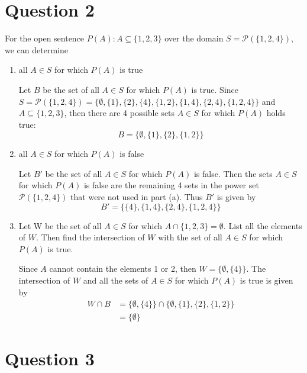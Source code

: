 \documentclass[11pt, oneside]{article}   	%
\begin{document}
\section*{Question 2}

For the open sentence $P(A) : A \subseteq \{1,2,3\}$ over the domain $S = \mathcal{P}(\{1,2,4\})$, we can determine

\begin{enumerate}[ (a)]           
    \item all $A \in S$ for which $P(A)$ is true
    
    Let $B$ be the set of all $A \in S$ for which $P(A)$ is true. Since $S = \mathcal{P}(\{1,2,4\}) =\{ \emptyset, \{1\}, \{2\}, \{4\}, \{1, 2\}, \{1, 4\}, \{2, 4\}, \{1, 2, 4\} \}$ and $A \subseteq \{1,2,3\}$, then there are 4 possible sets $A \in S$ for which $P(A)$ holds true: 
    $$B = \{\emptyset, \{1\}, \{2\}, \{1, 2\} \}$$
    
    \item all $A \in S$ for which $P(A)$ is false
    
   Let $B'$ be the set of all $A \in S$ for which $P(A)$ is false. Then the sets $A \in S$ for which $P(A)$ is false are the remaining 4 sets in the power set $\mathcal{P}(\{1,2,4\})$ that were not used in part (a). Thus $B'$ is given by
   $$B' =  \{ \{4\},\{1,4\}, \{2,4\}, \{1, 2, 4\} \}$$
    
    \item Let W be the set of all $A \in S$ for which $A \cap \{1,2,3\} = \emptyset$. List all the elements of $W$. Then find the intersection of $W$ with the set of all $A \in S$ for which $P(A)$ is true.  
    
    Since $A$ cannot contain the elements 1 or 2, then $W = \{ \emptyset, \{4\} \}$. The intersection of $W$ and all the sets of  $A \in S$ for which $P(A)$ is true is given by
    \begin{align*}
    W \cap B & = \{ \emptyset, \{4\} \} \cap \{\emptyset, \{1\}, \{2\}, \{1, 2\} \} \\
    & = \{\emptyset\}
    \end{align*}
        
\end{enumerate}

\section*{Question 3}
\end{document}

